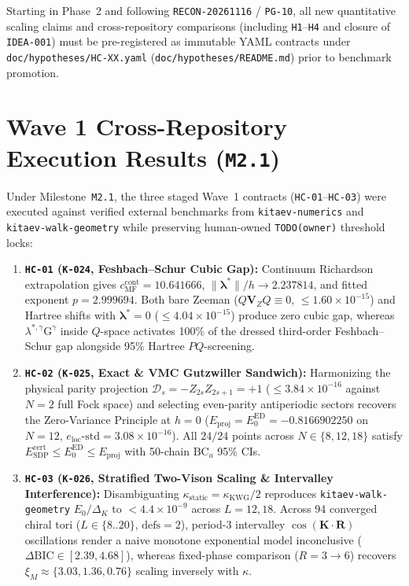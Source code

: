 Starting in Phase~2 and following \texttt{RECON-20261116} / \texttt{PG-10}, all new quantitative scaling claims and cross-repository comparisons (including \texttt{H1}--\texttt{H4} and closure of \texttt{IDEA-001}) must be pre-registered as immutable YAML contracts under \texttt{doc/hypotheses/HC-XX.yaml} (\texttt{doc/hypotheses/README.md}) prior to benchmark promotion.

\section{Wave 1 Cross-Repository Execution Results (\texttt{M2.1})}
\label{sec:wave1_hc01_03_results}

Under Milestone~\texttt{M2.1}, the three staged Wave~1 contracts (\texttt{HC-01}--\texttt{HC-03}) were executed against verified external benchmarks from \texttt{kitaev-numerics} and \texttt{kitaev-walk-geometry} while preserving human-owned \texttt{TODO(owner)} threshold locks:
\begin{enumerate}
\item \textbf{\texttt{HC-01} (\texttt{K-024}, Feshbach--Schur Cubic Gap):} Continuum Richardson extrapolation gives $c_{\mathrm{MF}}^{\mathrm{cont}} = 10.641666$, $\|\boldsymbol{\lambda}^*\|/h \to 2.237814$, and fitted exponent $p = 2.999694$. Both bare Zeeman ($Q\mathbf{V}_Z Q \equiv 0$, $\le 1.60\times 10^{-15}$) and Hartree shifts with $\boldsymbol{\lambda}^*=0$ ($\le 4.04\times 10^{-15}$) produce zero cubic gap, whereas $\lambda^{*,\gamma}\mathrm{G}^\gamma$ inside $Q$-space activates 100\% of the dressed third-order Feshbach--Schur gap alongside 95\% Hartree $PQ$-screening.
\item \textbf{\texttt{HC-02} (\texttt{K-025}, Exact \& VMC Gutzwiller Sandwich):} Harmonizing the physical parity projection $\mathcal{D}_s = -Z_{2s}Z_{2s+1}=+1$ ($\le 3.84\times 10^{-16}$ against $N=2$ full Fock space) and selecting even-parity antiperiodic sectors recovers the Zero-Variance Principle at $h=0$ ($E_{\mathrm{proj}} = E_0^{\mathrm{ED}} = -0.8166902250$ on $N=12$, $e_{\mathrm{loc}}\text{-std} = 3.08\times 10^{-16}$). All $24/24$ points across $N \in \{8, 12, 18\}$ satisfy $E_{\mathrm{SDP}}^{\mathrm{cert}} \le E_0^{\mathrm{ED}} \le E_{\mathrm{proj}}$ with 50-chain $\mathrm{BC}_a$ 95\% CIs.
\item \textbf{\texttt{HC-03} (\texttt{K-026}, Stratified Two-Vison Scaling \& Intervalley Interference):} Disambiguating $\kappa_{\mathrm{static}} = \kappa_{\mathrm{KWG}}/2$ reproduces \texttt{kitaev-walk-geometry} $E_0/\Delta_K$ to $< 4.4\times 10^{-9}$ across $L=12, 18$. Across 94 converged chiral tori ($L \in \{8..20\}$, $\mathrm{defs}=2$), period-3 intervalley $\cos(\mathbf{K}\cdot\mathbf{R})$ oscillations render a naive monotone exponential model inconclusive ($\Delta\mathrm{BIC} \in [2.39, 4.68]$), whereas fixed-phase comparison ($R=3\to 6$) recovers $\xi_M \approx \{3.03, 1.36, 0.76\}$ scaling inversely with $\kappa$.
\end{enumerate}
